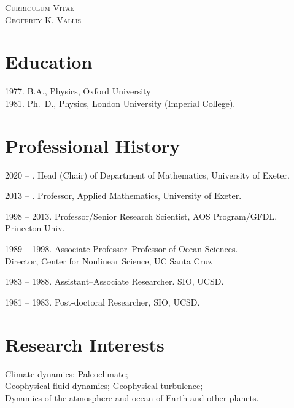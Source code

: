 \documentclass[11pt]{article}
\begin{document}
\begin{center}
{\Large\textsf{\scshape \LARGE Curriculum Vitae}} \\[0.2cm]
%
{\Large\textsf{\scshape Geoffrey K. Vallis} } 

\end{center}

\section*{Education}

1977. B.A., Physics,  Oxford University \\
1981. Ph.\ D.,  Physics, London University (Imperial College).

\section*{Professional History}

\begin{compactdesc}

\item 2020 -- .  Head (Chair) of Department of Mathematics, University of Exeter.
\item 2013 -- . Professor, Applied Mathematics, University of Exeter. 
\item 1998 -- 2013. Professor/Senior Research Scientist,  AOS Program/GFDL, Princeton Univ.
\item 1989 -- 1998.  Associate Professor--Professor of  Ocean Sciences.\\
        Director, Center for Nonlinear Science, UC Santa Cruz

\item 1983 -- 1988.   Assistant--Associate Researcher. SIO, UCSD.

\item 1981 -- 1983.   Post-doctoral Researcher, SIO, UCSD.

\end{compactdesc}



\section*{Research Interests}
Climate dynamics;  Paleoclimate; \\  Geophysical fluid dynamics; 
Geophysical turbulence; \\
Dynamics of the atmosphere and ocean of Earth and other planets. 
\end{document}
